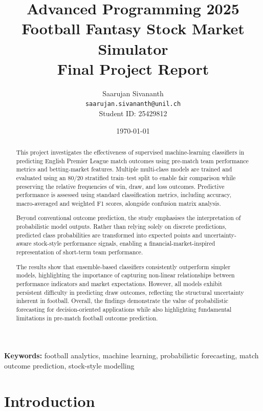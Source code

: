\documentclass[11pt,a4paper]{article}
\title{%
    \Large \textbf{Advanced Programming 2025} \\
    \vspace{0.5cm}
    \LARGE \textbf{Football Fantasy Stock Market Simulator} \\
    \vspace{0.3cm}
    \large Final Project Report
}
\author{
    Saarujan Sivananth \\
    \texttt{saarujan.sivananth@unil.ch} \\
    Student ID: 25429812
}
\date{\today}
\begin{document}
\maketitle
\thispagestyle{empty}

\begin{abstract}
This project investigates the effectiveness of supervised machine-learning classifiers in predicting English Premier League match outcomes using pre-match team performance metrics and betting-market features. Multiple multi-class models are trained and evaluated using an 80/20 stratified train--test split to enable fair comparison while preserving the relative frequencies of win, draw, and loss outcomes. Predictive performance is assessed using standard classification metrics, including accuracy, macro-averaged and weighted F1 scores, alongside confusion matrix analysis.

Beyond conventional outcome prediction, the study emphasises the interpretation of probabilistic model outputs. Rather than relying solely on discrete predictions, predicted class probabilities are transformed into expected points and uncertainty-aware stock-style performance signals, enabling a financial-market-inspired representation of short-term team performance.

The results show that ensemble-based classifiers consistently outperform simpler models, highlighting the importance of capturing non-linear relationships between performance indicators and market expectations. However, all models exhibit persistent difficulty in predicting draw outcomes, reflecting the structural uncertainty inherent in football. Overall, the findings demonstrate the value of probabilistic forecasting for decision-oriented applications while also highlighting fundamental limitations in pre-match football outcome prediction.
\end{abstract}

\vspace{0.5cm}
\noindent\textbf{Keywords:} football analytics, machine learning, probabilistic forecasting, match outcome prediction, stock-style modelling

\newpage
\tableofcontents
\newpage


\section{Introduction}
\label{sec:introduction}
\end{document}
